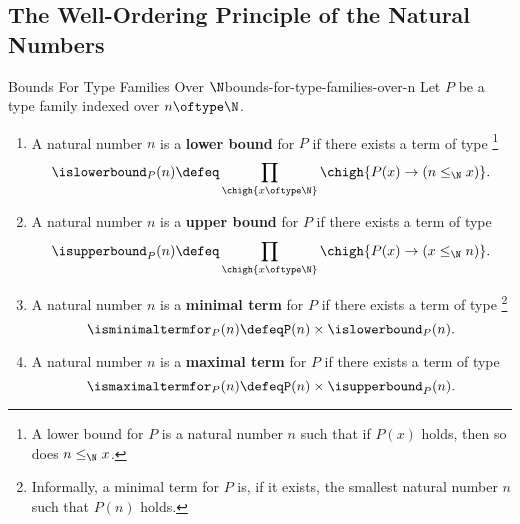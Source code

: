 \subsection{The Well-Ordering Principle of the Natural Numbers}\label{subsection-the-well-ordering-principle-of-the-natural-numbers}
\begin{definition}{Bounds For Type Families Over $\N$}{bounds-for-type-families-over-n}%
    Let $P$ be a type family indexed over $n\oftype\N$.%
    \begin{enumerate}
        \item\label{bounds-for-type-families-over-n-lower-bounds}A natural number $n$ is a \textbf{lower bound} for $P$ if there exists a term of type%
            \footnote{%
                A lower bound for $P$ is a natural number $n$ such that if $P(x)$ holds, then so does $n\leq_{\N}x$.
            }%
            \[
                \islowerbound_{P}(n)%
                \defeq%
                \prod_{\chigh{x\oftype\N}}\chigh{P(x)\to(n\leq_{\N}x)}.%
            \]%
        \item\label{bounds-for-type-families-over-n-upper-bounds}A natural number $n$ is a \textbf{upper bound} for $P$ if there exists a term of type
            \[
                \isupperbound_{P}(n)%
                \defeq%
                \prod_{\chigh{x\oftype\N}}\chigh{P(x)\to(x\leq_{\N}n)}.%
            \]%
        \item\label{bounds-for-type-families-over-n-minimal-terms}A natural number $n$ is a \textbf{minimal term} for $P$ if there exists a term of type
            \footnote{%
                Informally, a minimal term for $P$ is, if it exists, the smallest natural number $n$ such that $P(n)$ holds.
                \par\vspace*{\TCBBoxCorrection}
            }%
            \[
                \isminimaltermfor_{P}(n)%
                \defeq%
                P(n)\times\islowerbound_{P}(n).%
            \]%
        \item\label{bounds-for-type-families-over-n-maximal-terms}A natural number $n$ is a \textbf{maximal term} for $P$ if there exists a term of type
            \[
                \ismaximaltermfor_{P}(n)%
                \defeq%
                P(n)\times\isupperbound_{P}(n).%
            \]%
    \end{enumerate}
\end{definition}

